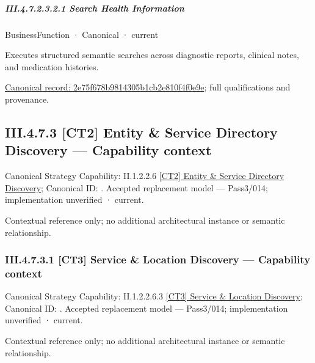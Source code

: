 \subparagraph*{III.4.7.2.3.2.1 Search Health Information}
\label{navigation:III.4.7.2.3.2.1}

\label{element:2e75f678b9814305b1cb2e810f4f0e9e}
{\small BusinessFunction · Canonical · current}\par

Executes structured semantic searches across diagnostic reports, clinical notes, and medication histories.


{\footnotesize \href{../../../../../../../continuum/business/business-function/2e75f678b9814305b1cb2e810f4f0e9e.md}{Canonical record: 2e75f678b9814305b1cb2e810f4f0e9e}; full qualifications and provenance.}\par
\subsection*{III.4.7.3 [CT2] Entity \& Service Directory Discovery — Capability context}
\label{navigation:III.4.7.3}

{\small Canonical Strategy Capability: II.1.2.2.6 \hyperref[element:83e30c3e91be432da6d92f30e5d7005d]{[CT2] Entity \& Service Directory Discovery}; Canonical ID: \texttt{}. Accepted replacement model — Pass3/014; implementation unverified · current.}\par
Contextual reference only; no additional architectural instance or semantic relationship.\par
\subsubsection*{III.4.7.3.1 [CT3] Service \& Location Discovery — Capability context}
\label{navigation:III.4.7.3.1}

{\small Canonical Strategy Capability: II.1.2.2.6.3 \hyperref[element:8c313972197c48369767dec1a745d7fc]{[CT3] Service \& Location Discovery}; Canonical ID: \texttt{}. Accepted replacement model — Pass3/014; implementation unverified · current.}\par
Contextual reference only; no additional architectural instance or semantic relationship.\par
